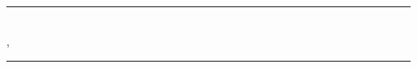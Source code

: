 ~
\vspace{5em}
\hrule
\begin{center}
   \huge
   \imprimirtitulo \\
   \normalsize
   \imprimirautor
   \hfill
   \imprimirlocal, \imprimirdata
\end{center}
\hrule
